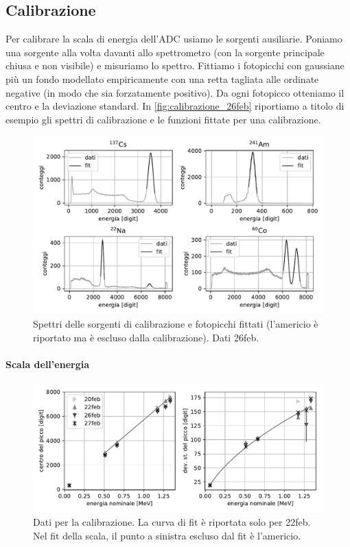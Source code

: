 \subsection{Calibrazione}\label{par:fondo1}

Per calibrare la scala di energia dell'ADC usiamo le sorgenti ausiliarie.
Poniamo una sorgente alla volta davanti allo spettrometro (con la sorgente principale chiusa e non visibile)
e misuriamo lo spettro.
Fittiamo i fotopicchi con gaussiane più un fondo modellato empiricamente con una retta tagliata alle ordinate negative
(in modo che sia forzatamente positivo).
Da ogni fotopicco otteniamo il centro e la deviazione standard.
In \autoref{fig:calibrazione_26feb} riportiamo a titolo di esempio gli spettri di calibrazione e le funzioni fittate per una calibrazione.

\begin{figure}
	\hspace{-2.5em}
	\includegraphics[width=40em]{calibrazione_26feb}
	\caption{\label{fig:calibrazione_26feb}
		Spettri delle sorgenti di calibrazione e fotopicchi fittati (l'americio è riportato ma è escluso dalla calibrazione). Dati 26feb.}
\end{figure}

\paragraph{Scala dell'energia}

\begin{figure}
	\centering
	\includegraphics[width=\textwidth]{calibration}
	\caption{\label{fig:calibration}
	Dati per la calibrazione.
	La curva di fit è riportata solo per 22feb.
	Nel fit della scala, il punto a sinistra escluso dal fit è l'americio.}
\end{figure}

